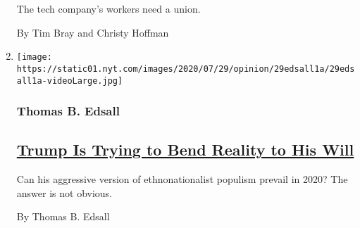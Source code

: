 \begin{enumerate}
  The tech company's workers need a union.

  By Tim Bray and Christy Hoffman
\item
  \texttt{[image: https://static01.nyt.com/images/2020/07/29/opinion/29edsall1a/29edsall1a-videoLarge.jpg]}

  \hypertarget{thomas-b-edsall}{%
  \subsubsection{Thomas B. Edsall}\label{thomas-b-edsall}}

  \hypertarget{trump-is-trying-to-bend-reality-to-his-will}{%
  \subsection{\texorpdfstring{\href{/2020/07/29/opinion/trump-2020-populism.html}{Trump
  Is Trying to Bend Reality to His
  Will}}{Trump Is Trying to Bend Reality to His Will}}\label{trump-is-trying-to-bend-reality-to-his-will}}

  Can his aggressive version of ethnonationalist populism prevail in
  2020? The answer is not obvious.

  By Thomas B. Edsall
\end{enumerate}

